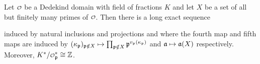      \begin{proposition}\label{prop:ideal_class_group_localization_exact_sequence}
      Let \(\smc{O}\) be a Dedekind domain with field of fractions \(K\) and let \(X\) be a set of all but finitely many primes of \(\smc{O}\). Then there is a long exact sequence
      \begin{center}
      \end{center}
      induced by natural inclusions and projections and where the fourth map and fifth maps are induced by \((\kappa_{\mathfrak{p}})_{\mathfrak{p} \notin X} \mapsto \prod_{\mathfrak{p} \notin X}\mathfrak{p}^{v_{\mathfrak{p}}(\kappa_{\mathfrak{p}})}\) and \(\mathfrak{a} \mapsto \mathfrak{a}(X)\) respectively. Moreover, \(K^{\ast}/\smc{O}_{\mf{p}}^{\ast} \cong \Z\).
    \end{proposition}
